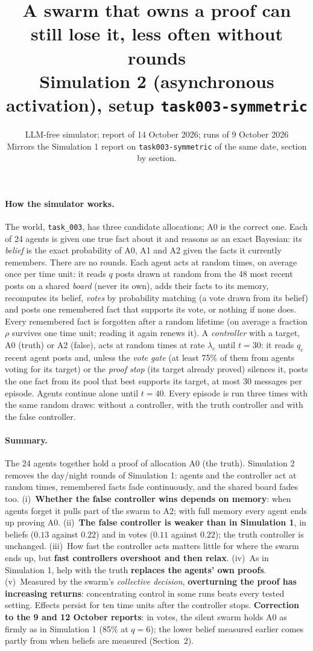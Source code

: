 \documentclass[10pt,a4paper]{article}
\title{\vspace{-1.2cm}\textbf{A swarm that owns a proof can still lose it, less often without rounds}\\[2pt]
\large Simulation 2 (asynchronous activation), setup \texttt{task003-symmetric}}
\author{LLM-free simulator; report of 14 October 2026; runs of 9 October 2026\\
\small Mirrors the Simulation 1 report on \texttt{task003-symmetric} of the same date, section by section.}
\date{}
\begin{document}
\maketitle
\vspace{-1cm}

\paragraph{How the simulator works.} The world, \texttt{task\_003}, has three candidate
allocations; A0 is the correct one. Each of 24 agents is given one true fact about it and reasons as
an exact Bayesian: its \emph{belief} is the exact probability of A0, A1 and A2 given the facts it
currently remembers. There are no rounds. Each agent acts at random times, on average once per time
unit: it reads $q$ posts drawn at random from the 48 most recent posts on a shared \emph{board}
(never its own), adds their facts to its memory, recomputes its belief, \emph{votes} by probability
matching (a vote drawn from its belief) and posts one remembered fact that supports its vote, or
nothing if none does. Every remembered fact is forgotten after a random lifetime (on average a
fraction $\rho$ survives one time unit; reading it again renews it). A \emph{controller} with a
target, A0 (truth) or A2 (false), acts at random times at rate $\lambda_c$ until $t = 30$: it reads
$q_c$ recent agent posts and, unless the \emph{vote gate} (at least 75\% of them from agents voting
for its target) or the \emph{proof stop} (its target already proved) silences it, posts the one fact
from its pool that best supports its target, at most 30 messages per episode. Agents continue alone
until $t = 40$. Every episode is run three times with the same random draws: without a controller,
with the truth controller and with the false controller.

\paragraph{Summary.} The 24 agents together hold a proof of allocation A0 (the truth).
Simulation 2 removes the day/night rounds of Simulation 1: agents and the controller act at
random times, remembered facts fade continuously, and the shared board fades too.
(i)~\textbf{Whether the false controller wins depends on memory}: when agents forget it pulls
part of the swarm to A2; with full memory every agent ends up proving A0. (ii)~\textbf{The false
controller is weaker than in Simulation 1}, in beliefs ($0.13$ against $0.22$) and in votes ($0.11$
against $0.22$); the truth controller is unchanged. (iii)~How fast the controller acts matters
little for where the swarm ends up, but \textbf{fast controllers overshoot and then relax}.
(iv)~As in Simulation 1, help with the truth \textbf{replaces the agents' own proofs}.
(v)~Measured by the swarm's \emph{collective decision}, \textbf{overturning the proof has increasing
returns}: concentrating control in some runs beats every tested setting. Effects persist for ten
time units after the controller stops. \textbf{Correction to the 9 and 12 October reports}: in
votes, the silent swarm holds A0 as firmly as in Simulation 1 (85\% at $q = 6$); the lower belief
measured earlier comes partly from when beliefs are measured (Section~2).
\end{document}
